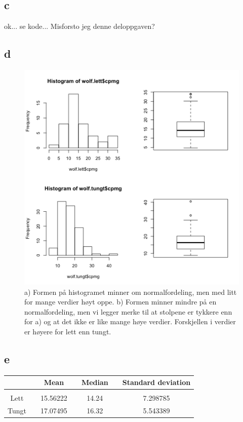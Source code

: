 \subsection*{c}

ok... se kode... Misforsto jeg denne deloppgaven?

\subsection*{d}

\begin{figure}[H]
		\centering
		\includegraphics[width=0.7\linewidth]{wolf_sammenlign.pdf}
		\caption{a) Formen på histogramet minner om normalfordeling, men med litt for mange verdier høyt oppe. b) Formen minner mindre på en normalfordeling, men vi legger merke til at stolpene er tykkere enn for a) og at det ikke er like mange høye verdier. Forskjellen i verdier er høyere for lett enn tungt.}
		\label{fig:sammenlign}
\end{figure}

\subsection*{e}

\begin{center}
\label{tab:mean_median_standard}
\begin{tabularx}{\textwidth}{c X c X c X c }
    \hline
    \hline
         && Mean && Median && Standard deviation \\
    \hline
    \\
        Lett   	&&     15.56222      &&      14.24      &&     7.298785       \\
        Tungt   &&     17.07495      &&      16.32      &&      5.543389       \\
    \hline
\end{tabularx}
\end{center}



